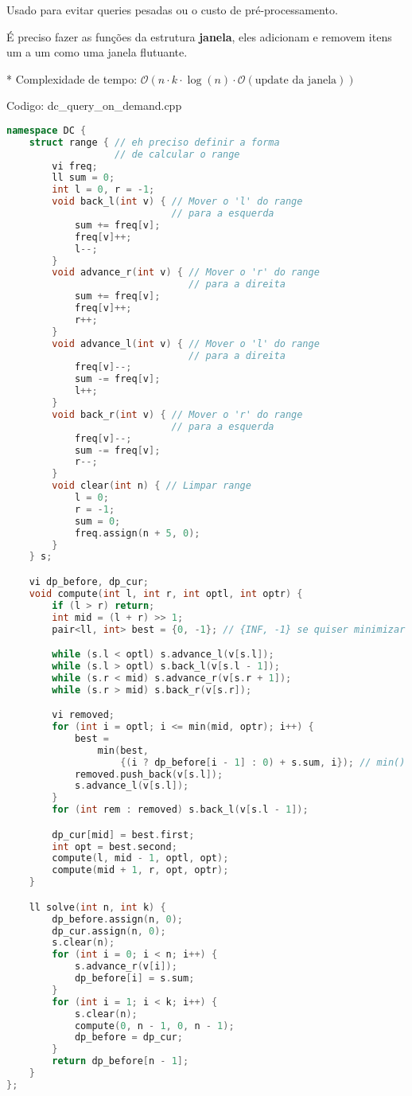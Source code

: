 \documentclass[10pt, a4paper, oneside]{book}
\begin{document}
Usado para evitar queries pesadas ou o custo de pré-processamento.  

É preciso fazer as funções da estrutura \textbf{janela}, eles adicionam e removem itens um a um como uma janela flutuante.



* Complexidade de tempo: $\mathcal{O}(n \cdot k \cdot \log(n) \cdot \mathcal{O}(\text{update da janela}))$
\hfill

Codigo: dc\_query\_on\_demand.cpp

\begin{lstlisting}[language=C++]
namespace DC {
    struct range { // eh preciso definir a forma
                   // de calcular o range
        vi freq;
        ll sum = 0;
        int l = 0, r = -1;
        void back_l(int v) { // Mover o 'l' do range
                             // para a esquerda
            sum += freq[v];
            freq[v]++;
            l--;
        }
        void advance_r(int v) { // Mover o 'r' do range
                                // para a direita
            sum += freq[v];
            freq[v]++;
            r++;
        }
        void advance_l(int v) { // Mover o 'l' do range
                                // para a direita
            freq[v]--;
            sum -= freq[v];
            l++;
        }
        void back_r(int v) { // Mover o 'r' do range
                             // para a esquerda
            freq[v]--;
            sum -= freq[v];
            r--;
        }
        void clear(int n) { // Limpar range
            l = 0;
            r = -1;
            sum = 0;
            freq.assign(n + 5, 0);
        }
    } s;

    vi dp_before, dp_cur;
    void compute(int l, int r, int optl, int optr) {
        if (l > r) return;
        int mid = (l + r) >> 1;
        pair<ll, int> best = {0, -1}; // {INF, -1} se quiser minimizar

        while (s.l < optl) s.advance_l(v[s.l]);
        while (s.l > optl) s.back_l(v[s.l - 1]);
        while (s.r < mid) s.advance_r(v[s.r + 1]);
        while (s.r > mid) s.back_r(v[s.r]);

        vi removed;
        for (int i = optl; i <= min(mid, optr); i++) {
            best =
                min(best,
                    {(i ? dp_before[i - 1] : 0) + s.sum, i}); // min() se quiser minimizar
            removed.push_back(v[s.l]);
            s.advance_l(v[s.l]);
        }
        for (int rem : removed) s.back_l(v[s.l - 1]);

        dp_cur[mid] = best.first;
        int opt = best.second;
        compute(l, mid - 1, optl, opt);
        compute(mid + 1, r, opt, optr);
    }

    ll solve(int n, int k) {
        dp_before.assign(n, 0);
        dp_cur.assign(n, 0);
        s.clear(n);
        for (int i = 0; i < n; i++) {
            s.advance_r(v[i]);
            dp_before[i] = s.sum;
        }
        for (int i = 1; i < k; i++) {
            s.clear(n);
            compute(0, n - 1, 0, n - 1);
            dp_before = dp_cur;
        }
        return dp_before[n - 1];
    }
};
\end{lstlisting}
\hfill
\end{document}
